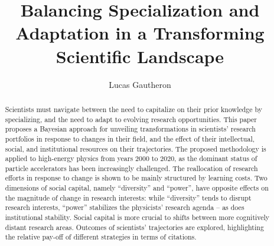 \documentclass{article}
\title{Balancing Specialization and Adaptation in a Transforming Scientific Landscape}
\author{Lucas Gautheron}
\date{}
\begin{document}
\maketitle

\begin{abstract}
    Scientists must navigate between the need to capitalize on their prior knowledge by specializing, and the need to adapt to evolving research opportunities. This paper proposes a Bayesian approach for unveiling transformations in scientists' research portfolios in response to changes in their field, and the effect of their intellectual, social, and institutional resources on their trajectories. The proposed methodology is applied to high-energy physics from years 2000 to 2020, as the dominant status of particle accelerators has been increasingly challenged. %
    The reallocation of research efforts in response to change is shown to be mainly structured by learning costs. Two dimensions of social capital, namely ``diversity'' and ``power'', have opposite effects on the magnitude of change in research interests: while ``diversity'' tends to disrupt research interests, ``power'' stabilizes the physicists' research agenda -- as does institutional stability. Social capital is more crucial to shifts between more cognitively distant research areas. Outcomes of scientists' trajectories are explored, highlighting the relative pay-off of different strategies in terms of citations.
\end{abstract}




\end{document}
